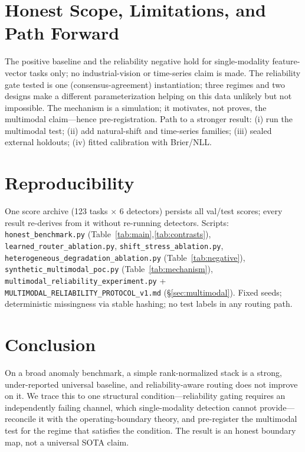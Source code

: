 \documentclass[11pt]{article}
\begin{document}
\section{Honest Scope, Limitations, and Path Forward}
The positive baseline and the reliability negative hold for single-modality
feature-vector tasks only; no industrial-vision or time-series claim is made. The
reliability gate tested is one (consensus-agreement) instantiation; three regimes and
two designs make a different parameterization helping on this data unlikely but not
impossible. The mechanism is a simulation; it motivates, not proves, the multimodal
claim---hence pre-registration. Path to a stronger result: (i) run the multimodal test;
(ii) add natural-shift and time-series families; (iii) sealed external holdouts; (iv)
fitted calibration with Brier/NLL.

\section{Reproducibility}
One score archive (123 tasks $\times$ 6 detectors) persists all val/test scores; every
result re-derives from it without re-running detectors. Scripts: \texttt{honest\_benchmark.py}
(Table~\ref{tab:main},\ref{tab:contrasts}), \texttt{learned\_router\_ablation.py},
\texttt{shift\_stress\_ablation.py}, \texttt{heterogeneous\_degradation\_ablation.py}
(Table~\ref{tab:negative}), \texttt{synthetic\_multimodal\_poc.py}
(Table~\ref{tab:mechanism}), \texttt{multimodal\_reliability\_experiment.py} +
\texttt{MULTIMODAL\_RELIABILITY\_PROTOCOL\_v1.md} (\S\ref{sec:multimodal}). Fixed seeds;
deterministic missingness via stable hashing; no test labels in any routing path.

\section{Conclusion}
On a broad anomaly benchmark, a simple rank-normalized stack is a strong, under-reported
universal baseline, and reliability-aware routing does not improve on it. We trace this
to one structural condition---reliability gating requires an independently failing
channel, which single-modality detection cannot provide---reconcile it with the
operating-boundary theory, and pre-register the multimodal test for the regime that
satisfies the condition. The result is an honest boundary map, not a universal SOTA
claim.

\appendix
\end{document}
